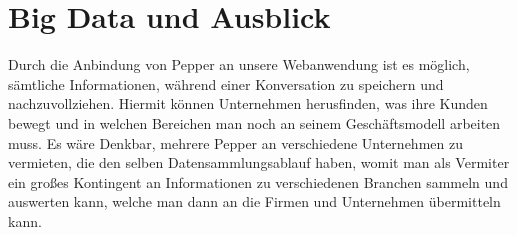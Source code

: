 \chapter{Big Data und Ausblick}
\label{sec:ausblick}


Durch die Anbindung von Pepper an unsere Webanwendung ist es möglich, sämtliche Informationen,
während einer Konversation zu speichern und nachzuvollziehen. Hiermit können Unternehmen
herusfinden, was ihre Kunden bewegt und in welchen Bereichen man noch an seinem
Geschäftsmodell arbeiten muss. Es wäre Denkbar, mehrere Pepper an verschiedene Unternehmen zu vermieten,
die den selben Datensammlungsablauf haben, womit man als Vermiter ein großes Kontingent an
Informationen zu verschiedenen Branchen sammeln und auswerten kann, welche man dann an die Firmen und Unternehmen
übermitteln kann.

